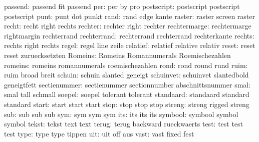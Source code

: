             passend:  passend              fit                 passend
                per:  per                  by                  pro
         postscript:  postscript           postscript          postscript
               punt:  punt                 dot                 punkt
               rand:  rand                 edge                kante
             raster:  raster               screen              raster
              recht:  recht                right               rechts
            rechter:  rechter              right               rechter
       rechtermarge:  rechtermarge         rightmargin         rechterrand
        rechterrand:  rechterrand          rechterrand         rechterkante
             rechts:  rechts               right               rechts
              regel:  regel                line                zeile
           relatief:  relatief             relative            relativ
              reset:  reset                reset               zuruecksetzten
            Romeins:  Romeins              Romannumerals       Roemischezahlen
            romeins:  romeins              romannumerals       roemischezahlen
               rond:  rond                 round               rund
               ruim:  ruim                 broad               breit
             schuin:  schuin               slanted             geneigt
          schuinvet:  schuinvet            slantedbold         geneigtfett
       sectienummer:  sectienummer         sectionnumber       abschnittsnummer
               smal:  smal                 tall                schmall
             soepel:  soepel               tolerant            tolerant
          standaard:  standaard            standard            standard
              start:  start                start               start
               stop:  stop                 stop                stop
             streng:  streng               rigged              streng
                sub:  sub                  sub                 sub
                sym:  sym                  sym                 sym
                its:  its                  its                 its
            symbool:  symbool              symbol              symbol
              tekst:  tekst                text                text
              terug:  terug                backward            rueckwaerts
               test:  test                 test                test
               type:  type                 type                tippen
                uit:  uit                  off                 aus
               vast:  vast                 fixed               fest
